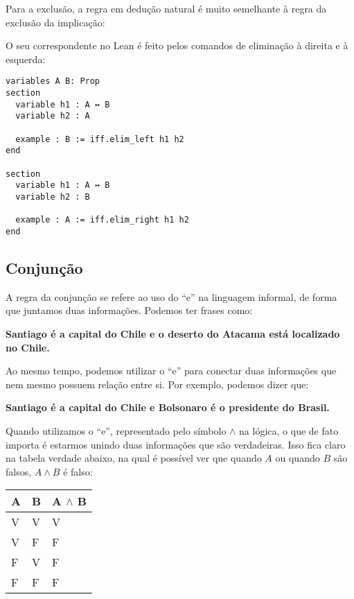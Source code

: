 Para a exclusão, a regra em dedução natural é muito semelhante à regra da exclusão da implicação:

\begin{prooftree}
\end{prooftree}
\begin{prooftree}
\end{prooftree}

O seu correspondente no Lean é feito pelos comandos de eliminação à direita e à esquerda:

\begin{lstlisting} 
variables A B: Prop
section
  variable h1 : A ↔ B
  variable h2 : A

  example : B := iff.elim_left h1 h2
end

section
  variable h1 : A ↔ B
  variable h2 : B

  example : A := iff.elim_right h1 h2
end

\end{lstlisting}


\subsection{Conjunção}
A regra da conjunção se refere ao uso do ``e'' na linguagem informal, de forma que juntamos duas informações. Podemos ter frases como:
\begin{center}
\textbf{Santiago é a capital do Chile e o deserto do Atacama está localizado no Chile.}
\end{center}

Ao mesmo tempo, podemos utilizar o ``e'' para conectar duas informações que nem mesmo possuem relação entre si. Por exemplo, podemos dizer que:
\begin{center}
\textbf{Santiago é a capital do Chile e Bolsonaro é o presidente do Brasil.}
\end{center}
Quando utilizamos o ``e'', representado pelo símbolo $\land$ na lógica, o que de fato importa é estarmos unindo duas informações que são verdadeiras. Isso fica claro na tabela verdade abaixo, na qual é possível ver que quando $A$ ou quando $B$ são falsos, $A\land B$ é falso:

\begin{table}[htb!]
\centering
\begin{tabular}{|l|l|l|}
\hline
\textbf{A} & \textbf{B} & \textbf{A $\land$ B} \\ \hline
V          & V          & V                  \\ \hline
V          & F          & F                  \\ \hline
F          & V          & F                  \\ \hline
F          & F          & F                  \\ \hline
\end{tabular}
\end{table}

